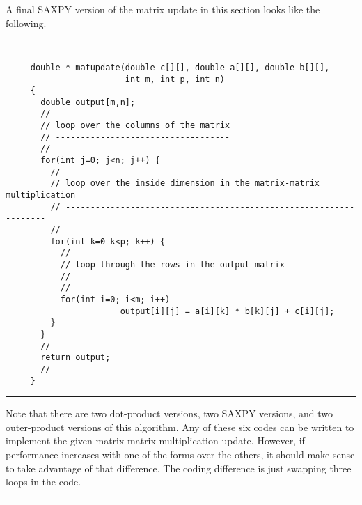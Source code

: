 \documentclass[10pt,fleqn]{article}
\begin{document}
A final SAXPY version of the matrix update in this section looks like the
following.
\vskip0.1in\hrule\vskip0.1in
\begin{verbatim}

     double * matupdate(double c[][], double a[][], double b[][],
                        int m, int p, int n)
     {
       double output[m,n];
       //
       // loop over the columns of the matrix
       // -----------------------------------
       //
       for(int j=0; j<n; j++) {
         //
         // loop over the inside dimension in the matrix-matrix multiplication
         // ------------------------------------------------------------------
         //
         for(int k=0 k<p; k++) {
           //
           // loop through the rows in the output matrix
           // ------------------------------------------
           //
           for(int i=0; i<m; i++)
                       output[i][j] = a[i][k] * b[k][j] + c[i][j];
         }
       }
       //
       return output;
       //
     }

\end{verbatim}
\vskip0.1in\hrule\vskip0.1in
\noindent
Note that there are two dot-product versions, two SAXPY versions, and two
outer-product versions of this algorithm. Any of these six codes can be written
to implement the given matrix-matrix multiplication update. However, if
performance increases with one of the forms over the others, it should make
sense to take advantage of that difference. The coding difference is just
swapping three loops in the code.
\vskip0.1in\hrule\vskip0.1in
\newpage
\end{document}
